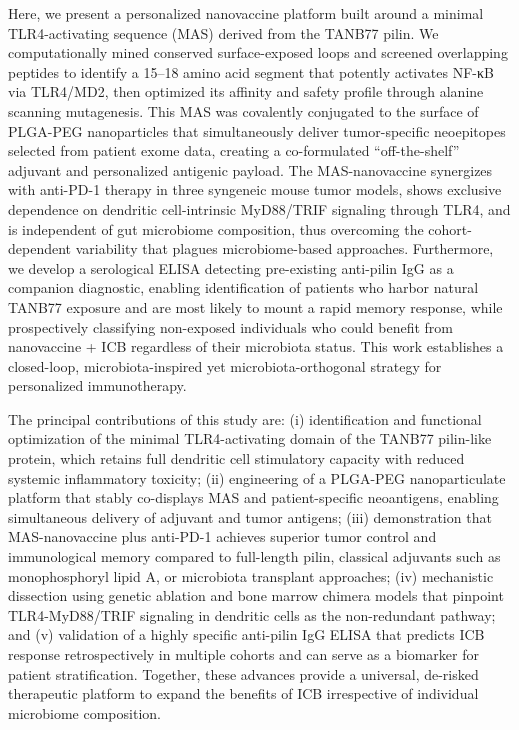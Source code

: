 \documentclass{article}
\begin{document}
Here, we present a personalized nanovaccine platform built around a minimal TLR4-activating sequence (MAS) derived from the TANB77 pilin. We computationally mined conserved surface-exposed loops and screened overlapping peptides to identify a 15--18 amino acid segment that potently activates NF-κB via TLR4/MD2, then optimized its affinity and safety profile through alanine scanning mutagenesis. This MAS was covalently conjugated to the surface of PLGA-PEG nanoparticles that simultaneously deliver tumor-specific neoepitopes selected from patient exome data, creating a co-formulated “off-the-shelf” adjuvant and personalized antigenic payload. The MAS-nanovaccine synergizes with anti-PD-1 therapy in three syngeneic mouse tumor models, shows exclusive dependence on dendritic cell-intrinsic MyD88/TRIF signaling through TLR4, and is independent of gut microbiome composition, thus overcoming the cohort-dependent variability that plagues microbiome-based approaches. Furthermore, we develop a serological ELISA detecting pre-existing anti-pilin IgG as a companion diagnostic, enabling identification of patients who harbor natural TANB77 exposure and are most likely to mount a rapid memory response, while prospectively classifying non-exposed individuals who could benefit from nanovaccine + ICB regardless of their microbiota status. This work establishes a closed-loop, microbiota-inspired yet microbiota-orthogonal strategy for personalized immunotherapy.

The principal contributions of this study are: (i) identification and functional optimization of the minimal TLR4-activating domain of the TANB77 pilin-like protein, which retains full dendritic cell stimulatory capacity with reduced systemic inflammatory toxicity; (ii) engineering of a PLGA-PEG nanoparticulate platform that stably co-displays MAS and patient-specific neoantigens, enabling simultaneous delivery of adjuvant and tumor antigens; (iii) demonstration that MAS-nanovaccine plus anti-PD-1 achieves superior tumor control and immunological memory compared to full-length pilin, classical adjuvants such as monophosphoryl lipid A, or microbiota transplant approaches; (iv) mechanistic dissection using genetic ablation and bone marrow chimera models that pinpoint TLR4-MyD88/TRIF signaling in dendritic cells as the non-redundant pathway; and (v) validation of a highly specific anti-pilin IgG ELISA that predicts ICB response retrospectively in multiple cohorts and can serve as a biomarker for patient stratification. Together, these advances provide a universal, de-risked therapeutic platform to expand the benefits of ICB irrespective of individual microbiome composition.
\end{document}

